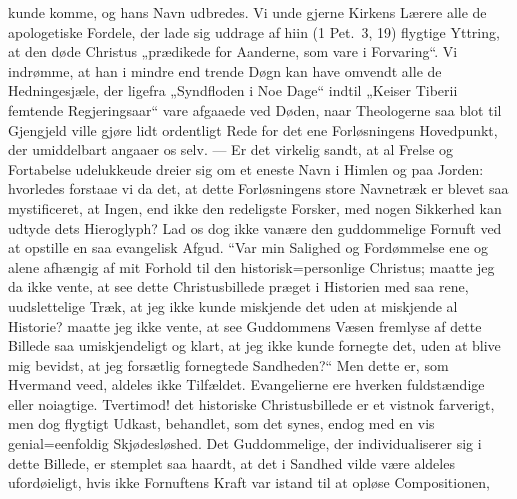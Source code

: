 \documentclass[12pt,a4paper]{book}
\begin{document}
kunde komme, og hans Navn udbredes. Vi unde gjerne Kirkens Lærere alle de
apologetiske Fordele, der lade sig uddrage af hiin (1 Pet.\ 3, 19) flygtige
Yttring, at den døde Christus „prædikede for Aanderne, som vare i Forvaring“. Vi
indrømme, at han i mindre end trende Døgn kan have omvendt alle de
Hedningesjæle, der ligefra „Syndfloden i Noe Dage“ indtil „Keiser Tiberii
femtende Regjeringsaar“ vare afgaaede ved Døden, naar Theologerne saa blot til
Gjengjeld ville gjøre lidt ordentligt Rede for det ene Forløsningens Hovedpunkt,
der umiddelbart angaaer os selv. --- Er det virkelig sandt, at al Frelse og
Fortabelse udelukkeude dreier sig om et eneste Navn i Himlen og paa Jorden:
hvorledes forstaae vi da det, at dette Forløsningens store
Navnetræk er blevet saa mystificeret, at Ingen, end ikke den redeligste Forsker,
med nogen Sikkerhed kan udtyde dets Hieroglyph? Lad os dog ikke vanære den
guddommelige Fornuft ved at opstille en saa evangelisk Afgud. “Var min Salighed
og Fordømmelse ene og alene afhængig af mit Forhold til den historisk=personlige
Christus; maatte jeg da ikke vente, at see dette Christusbillede præget i
Historien med saa rene, uudslettelige Træk, at jeg ikke kunde miskjende det uden
at miskjende al Historie? maatte jeg ikke vente, at see Guddommens Væsen fremlyse
af dette Billede saa umiskjendeligt og klart, at jeg ikke kunde fornegte det,
uden at blive mig bevidst, at jeg forsætlig fornegtede Sandheden?“ Men dette er,
som Hvermand veed, aldeles ikke Tilfældet. Evangelierne ere hverken fuldstændige
eller noiagtige. Tvertimod! det historiske Christusbillede er et vistnok
farverigt, men dog flygtigt Udkast, behandlet, som det synes, endog med en vis
genial=eenfoldig Skjødesløshed. Det Guddommelige, der individualiserer sig i
dette Billede, er stemplet saa haardt, at det i Sandhed vilde være aldeles
ufordøieligt, hvis ikke Fornuftens Kraft var istand til at opløse Compositionen,
\end{document}
